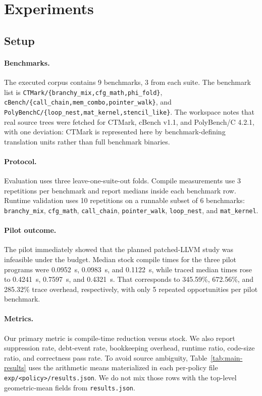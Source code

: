 \documentclass{article}
\begin{document}
\section{Experiments}
\label{sec:experiments}

\subsection{Setup}

\paragraph{Benchmarks.}
The executed corpus contains 9 benchmarks, 3 from each suite. The benchmark list is \texttt{CTMark/\{branchy\_mix,cfg\_math,phi\_fold\}}, \texttt{cBench/\{call\_chain,mem\_combo,pointer\_walk\}}, and \texttt{PolyBenchC/\{loop\_nest,mat\_kernel,stencil\_like\}}. The workspace notes that real source trees were fetched for CTMark, cBench v1.1, and PolyBench/C 4.2.1, with one deviation: CTMark is represented here by benchmark-defining translation units rather than full benchmark binaries.

\paragraph{Protocol.}
Evaluation uses three leave-one-suite-out folds. Compile measurements use 3 repetitions per benchmark and report medians inside each benchmark row. Runtime validation uses 10 repetitions on a runnable subset of 6 benchmarks: \texttt{branchy\_mix}, \texttt{cfg\_math}, \texttt{call\_chain}, \texttt{pointer\_walk}, \texttt{loop\_nest}, and \texttt{mat\_kernel}.

\paragraph{Pilot outcome.}
The pilot immediately showed that the planned patched-LLVM study was infeasible under the budget. Median stock compile times for the three pilot programs were 0.0952~s, 0.0983~s, and 0.1122~s, while traced median times rose to 0.4241~s, 0.7597~s, and 0.4321~s. That corresponds to 345.59\%, 672.56\%, and 285.32\% trace overhead, respectively, with only 5 repeated opportunities per pilot benchmark.

\paragraph{Metrics.}
Our primary metric is compile-time reduction versus stock. We also report suppression rate, debt-event rate, bookkeeping overhead, runtime ratio, code-size ratio, and correctness pass rate. To avoid source ambiguity, Table~\ref{tab:main-results} uses the arithmetic means materialized in each per-policy file \texttt{exp/<policy>/results.json}. We do not mix those rows with the top-level geometric-mean fields from \texttt{results.json}.
\end{document}
